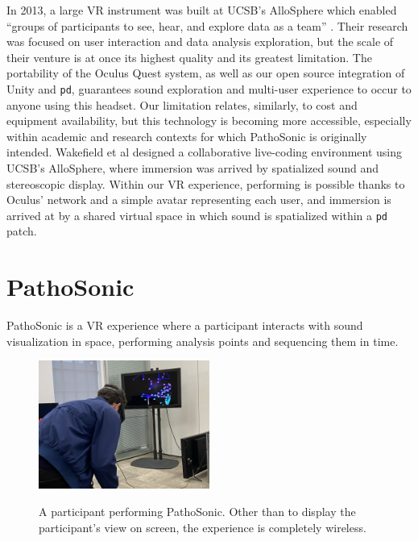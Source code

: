 \documentclass{nime-alternate}
\begin{document}
In 2013, a large VR instrument was built at UCSB's AlloSphere which enabled ``groups of participants to see, hear, and explore data as a team'' \cite{KUCHERAMORIN201410}. Their research was focused on user interaction and data analysis exploration, but the scale of their venture is at once its highest quality and its greatest limitation. The portability of the Oculus Quest system, as well as our open source integration of Unity and \texttt{pd}, guarantees sound exploration and multi-user experience to occur to anyone using this headset. Our limitation relates, similarly, to cost and equipment availability, but this technology is becoming more accessible, especially within academic and research contexts for which PathoSonic is originally intended. Wakefield et al \cite{gwakefield2014} designed a collaborative live-coding environment using UCSB's AlloSphere, where immersion was arrived by spatialized sound and stereoscopic display. Within our VR experience, performing is possible thanks to Oculus' network and a simple avatar representing each user, and immersion is arrived at by a shared virtual space in which sound is spatialized within a \texttt{pd} patch. 

\section{PathoSonic}

PathoSonic is a VR experience where a participant interacts with sound visualization in space, performing analysis points and sequencing them in time.

\begin{figure}[htbp]
       \centering
              \includegraphics[width=0.5\textwidth]{IMG_4563.jpg}
       \label{A participant performing PathoSonic. Other than to display the participant's view on screen, the experience is completely wireless.}
       \caption{A participant performing PathoSonic. Other than to display the participant's view on screen, the experience is completely wireless.}
\end{figure}
\end{document}
